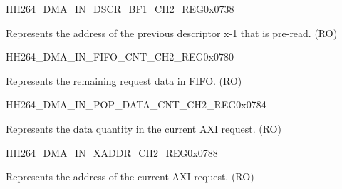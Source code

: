 \begin{register}{H}{H264\_DMA\_IN\_DSCR\_BF1\_CH2\_REG}{0x0738}\label{regdesc:H264DMAINDSCRBF1CH2REG}
%
\regnewline%
\begin{regdesc}\begin{reglist}
\label{fielddesc:H264DMAINLINKDSCRBF1CH2}\item [H264\_DMA\_INLINK\_DSCR\_BF1\_CH2] Represents the address of the previous descriptor x-1 that is pre-read. (RO)
\end{reglist}\end{regdesc}
\end{register}

\begin{register}{H}{H264\_DMA\_IN\_FIFO\_CNT\_CH2\_REG}{0x0780}\label{regdesc:H264DMAINFIFOCNTCH2REG}
%
%
\regnewline%
\begin{regdesc}\begin{reglist}
\label{fielddesc:H264DMAINCMDFIFOINFIFOCNTCH2}\item [H264\_DMA\_IN\_CMDFIFO\_INFIFO\_CNT\_CH2] Represents the remaining request data in FIFO. (RO)
\end{reglist}\end{regdesc}
\end{register}


\begin{register}{H}{H264\_DMA\_IN\_POP\_DATA\_CNT\_CH2\_REG}{0x0784}\label{regdesc:H264DMAINPOPDATACNTCH2REG}
%
%
\regnewline%
\begin{regdesc}\begin{reglist}
\label{fielddesc:H264DMAINCMDFIFOPOPDATACNTCH2}\item [H264\_DMA\_IN\_CMDFIFO\_POP\_DATA\_CNT\_CH2] Represents the data quantity in the current AXI request. (RO)
\end{reglist}\end{regdesc}
\end{register}


\begin{register}{H}{H264\_DMA\_IN\_XADDR\_CH2\_REG}{0x0788}\label{regdesc:H264DMAINXADDRCH2REG}
%
\regnewline%
\begin{regdesc}\begin{reglist}
\label{fielddesc:H264DMAINCMDFIFOXADDRCH2}\item [H264\_DMA\_IN\_CMDFIFO\_XADDR\_CH2] Represents the address of the current AXI request. (RO)
\end{reglist}\end{regdesc}
\end{register}


